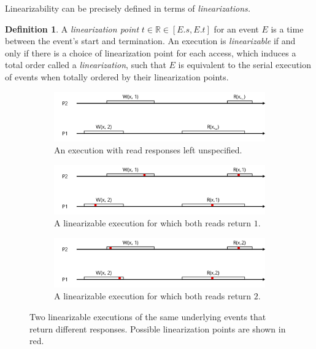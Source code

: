 \documentclass[]             %
{NASA}                       %
\theoremstyle{definition}
\newtheorem{definition}{Definition}[section]
\begin{document}
Linearizability can be precisely defined in terms of
\emph{linearizations.}

\begin{definition}
  A \emph{linearization point} $t \in \mathbb{R} \in [E.s, E.t]$ for an
  event $E$ is a time between the event's start and termination. An
  execution is \emph{linearizable} if and only if there is a choice of
  linearization point for each access, which induces a total order called a \emph{linearization},
  such that $E$ is equivalent to
  the serial execution of events when totally ordered by their
  linearization points.
\end{definition}

\begin{figure}[p]
  \begin{subfigure}[a]{1\textwidth}
    \center
    \includegraphics[scale=0.4]{images/linearTemplate.png}
    \caption{An execution with read responses left unspecified.}
    \label{fig:nonlinear}
  \end{subfigure}
  \begin{subfigure}[b]{1\textwidth}
    \center
    \includegraphics[scale=0.4]{images/linear3.png}
    \caption{A linearizable execution for which both reads return $1$.}
  \end{subfigure}
  \begin{subfigure}[c]{1\textwidth}
    \center
    \includegraphics[scale=0.4]{images/linear2.png}
    \caption{A linearizable execution for which both reads return $2$.}
  \end{subfigure}
  \caption{Two linearizable executions of the same underlying events that return different responses. Possible linearization points are shown in red.}
  \label{fig:linearization}
\end{figure}
\end{document}
